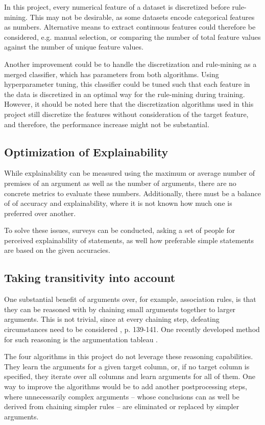 In this project, every numerical feature of a dataset is discretized before rule-mining. This may not be desirable, as some datasets encode categorical features as numbers. Alternative means to extract continuous features could therefore be considered, e.g. manual selection, or comparing the number of total feature values against the number of unique feature values.

Another improvement could be to handle the discretization and rule-mining as a merged classifier, which has parameters from both algorithms. Using hyperparameter tuning, this classifier could be tuned such that each feature in the data is discretized in an optimal way for the rule-mining during training. However, it should be noted here that the discretization algorithms used in this project still discretize the features without consideration of the target feature, and therefore, the performance increase might not be substantial. 

\subsection*{Optimization of Explainability}

While explainability can be measured using the maximum or average number of premises of an argument as well as the number of arguments, there are no concrete metrics to evaluate these numbers. Additionally, there must be a balance of of accuracy and explainability, where it is not known how much one is preferred over another.

To solve these issues, surveys can be conducted, asking a set of people for perceived explainability of statements, as well how preferable simple statements are based on the given accuracies.

\subsection*{Taking transitivity into account}

One substantial benefit of arguments over, for example, association rules, is that they can be reasoned with by chaining small arguments together to larger arguments. This is not trivial, since at every chaining step, defeating circumstances need to be considered  \citep{verheijProofProbabilities2017}, p. 139-141. One recently developed method for such reasoning is the argumentation tableau \citep{roosSemanticTableauMethod2020}.

The four algorithms in this project do not leverage these reasoning capabilities. They learn the arguments for a given target column, or, if no target column is specified, they iterate over all columns and learn arguments for all of them. One way to improve the algorithms would be to add another postprocessing steps, where unnecessarily complex arguments -- whose conclusions can as well be derived from chaining simpler rules -- are eliminated or replaced by simpler arguments. 
